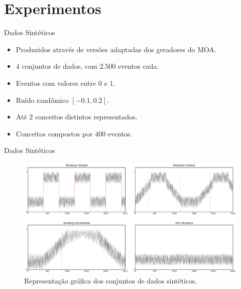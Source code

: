 \documentclass[10pt]{beamer}
\begin{document}
\section{Experimentos}


\begin{frame}{Dados Sintéticos}
    \begin{itemize}
        \item Produzidos através de versões adaptadas dos geradores do MOA.
        \item $4$ conjuntos de dados, com $2.500$ eventos cada.
        \item Eventos com valores entre $0$ e $1$.
        \item Ruído randômico $[-0.1, 0.2]$.
        \item Até $2$ conceitos distintos representados.
        \item Conceitos compostos por $400$ eventos.
    \end{itemize}
\end{frame}

\begin{frame}{Dados Sintéticos}
    \begin{figure}[ht]
        \begin{center}
            \includegraphics[width=\textwidth]{imagens/conjuntos_dados_sinteticos.png}
            \caption{Representação gráfica dos conjuntos de dados sintéticos.}
            \label{fig:conjuntos_dados_sinteticos}
        \end{center}
    \end{figure}
\end{frame}
\end{document}

